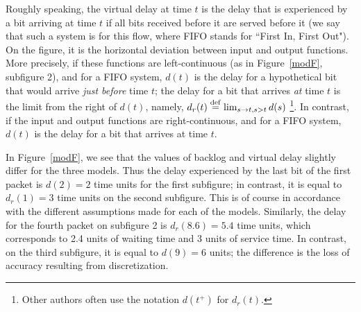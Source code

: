 Roughly speaking, the virtual delay at time $t$ is the
delay that is experienced by a bit arriving at time $t$ if
all bits received before it are served before it (we say that such a system is  for this flow, where FIFO stands for ``First In, First Out"). On the figure, it is the horizontal deviation
between input and output functions.  More precisely, if these functions %
%
are left-continuous (as in Figure~\ref{modF}, subfigure 2), and for a FIFO system, $d(t)$ is the delay for a  hypothetical bit that would arrive \emph{just before} time $t$; the delay for a bit that arrives \emph{at} time $t$ is the limit from the right of $d(t)$, namely, $d_r(t)\stackrel{\mathrm{def}}{=}\lim_{s \rightarrow t, s>t}d(s)$
\footnote{Other authors often use the
notation $d(t^+)$ for $d_r(t)$.}.
In contrast, if the input and output functions are right-continuous, and for a FIFO system, $d(t)$ is the delay for a bit that arrives at time $t$.

In Figure~\ref{modF}, we see that the values of backlog and
virtual delay slightly differ for the three models. Thus the delay
experienced by the last bit of the first packet is $d(2)=2$ time
units for the first subfigure; in contrast, it is equal to
$d_r(1)=3$ time units on the second subfigure. This is of course in
accordance with the different assumptions made for each of the
models. Similarly, the delay for the fourth packet on subfigure 2
is $d_r(8.6)=5.4$ time units, which corresponds to 2.4 units of
waiting time and 3 units of service time. In contrast, on the
third subfigure, it is equal to $d(9)=6$ units; the difference is
the loss of accuracy resulting from discretization.



